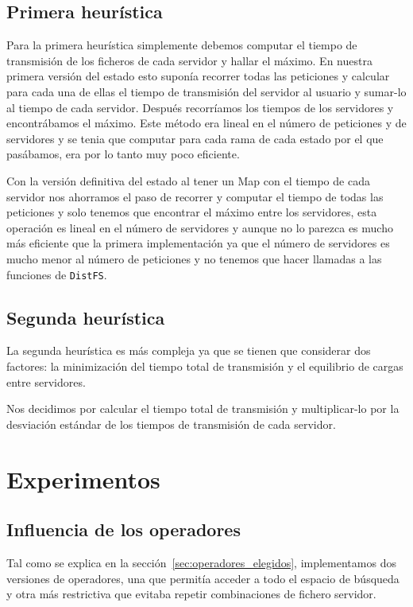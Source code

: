 \subsection{Primera heurística}

Para la primera heurística simplemente debemos computar el tiempo de transmisión de los ficheros de cada servidor y hallar
el máximo. En nuestra primera versión del estado esto suponía recorrer todas las peticiones y calcular para cada una de
ellas el tiempo de transmisión del servidor al usuario y sumar-lo al tiempo de cada servidor. Después recorríamos los tiempos
de los servidores y encontrábamos el máximo. Este método era lineal en el número de peticiones y de servidores y se tenia
que computar para cada rama de cada estado por el que pasábamos, era por lo tanto muy poco eficiente.

Con la versión definitiva del estado al tener un Map con el tiempo de cada servidor nos ahorramos el paso de
recorrer y computar el tiempo de todas las peticiones y solo tenemos que encontrar el máximo entre los servidores, 
esta operación es lineal en el número de servidores y aunque no lo parezca es mucho más eficiente que la primera
implementación ya que el número de servidores es mucho menor al número de peticiones y no tenemos que hacer
llamadas a las funciones de \texttt{DistFS}.

\subsection{Segunda heurística}

La segunda heurística es más compleja ya que se tienen que considerar dos factores: la minimización del tiempo total
de transmisión y el equilibrio de cargas entre servidores.

Nos decidimos por calcular el tiempo total de transmisión y multiplicar-lo por la desviación estándar de los tiempos
de transmisión de cada servidor.

\pagebreak
\section{Experimentos}

\subsection{Influencia de los operadores}

Tal como se explica en la sección~\ref{sec:operadores_elegidos}, implementamos dos versiones de operadores,
una que permitía acceder a todo el espacio de búsqueda y otra más restrictiva que evitaba repetir combinaciones
de fichero servidor.

